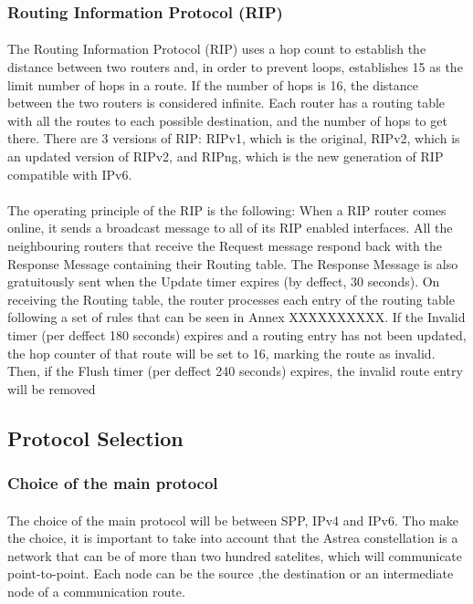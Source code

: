 \begin{itemize}
\subsubsection*{Routing Information Protocol (RIP)\cite{RIPv2}\cite{RIPng}}
\paragraph{}The Routing Information Protocol (RIP) uses a hop count to establish the distance between two routers and, in order to prevent loops, establishes 15 as the limit number of hops in a route. If the number of hops is 16, the distance between the two routers is considered infinite. Each router has a routing table with all the routes to each possible destination, and the number of hops to get there. There are 3 versions of RIP: RIPv1, which is the original, RIPv2, which is an updated version of RIPv2, and RIPng, which is the new generation of RIP compatible with IPv6.
\paragraph{}The operating principle of the RIP is the following: When a RIP router comes online, it sends a broadcast message to all of its RIP enabled interfaces. All the neighbouring routers that receive the Request message respond back with the Response Message containing their Routing table. The Response Message is also gratuitously sent when the Update timer expires (by deffect, 30 seconds). On receiving the Routing table, the router processes each entry of the routing table following a set of rules that can be seen in Annex XXXXXXXXXX. If the Invalid timer (per deffect 180 seconds) expires and a routing entry has not been updated, the hop counter of that route will be set to 16, marking the route as invalid. Then, if the Flush timer (per deffect 240 seconds) expires, the invalid route entry will be removed

\subsection{Protocol Selection}

\subsubsection{Choice of the main protocol}
\paragraph{}The choice of the main protocol will be between SPP, IPv4 and IPv6. Tho make the choice, it is important to take into account that the Astrea constellation is a network that can be of more than two hundred satelites, which will communicate point-to-point. Each node can be the source ,the destination or an intermediate node of a communication route.

\end{itemize}
